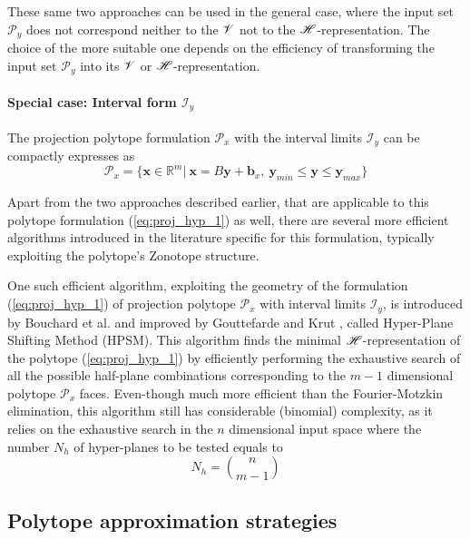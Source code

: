 These same two approaches can be used in the general case, where the input set $\mathcal{P}_y$ does not correspond neither to the $\mathscr{V}$ not to the $\mathscr{H}$-representation. The choice of the more suitable one depends on the efficiency of transforming the input set $\mathcal{P}_y$ into its $\mathscr{V}$ or $\mathscr{H}$-representation. 


\paragraph*{Special case: Interval form $\mathcal{I}_y$} 

The projection polytope formulation $\mathcal{P}_x$ with the interval limits $\mathcal{I}_y$ can be compactly expresses as
\begin{equation}
    \mathcal{P}_x=\{\bm{x}\in\mathbb{R}^m |~ \bm{x} = B\bm{y} + \bm{b}_x,~\bm{y}_{min} \leq  \bm{y} \leq \bm{y}_{max}  \}
    \label{eq:proj_hyp_1}
\end{equation}

Apart from the two approaches described earlier, that are applicable to this polytope formulation (\ref{eq:proj_hyp_1}) as well, there are several more efficient algorithms introduced in the literature specific for this formulation, typically exploiting the polytope's Zonotope structure.

One such  efficient algorithm, exploiting the geometry of the formulation (\ref{eq:proj_hyp_1}) of projection polytope $\mathcal{P}_x$ with interval limits $\mathcal{I}_y$, is introduced by Bouchard et al. \cite{Bouchard2009} and improved by Gouttefarde and Krut \cite{hyper_psm}, called Hyper-Plane Shifting Method (HPSM). This algorithm finds the minimal $\mathscr{H}$-representation of the polytope (\ref{eq:proj_hyp_1}) by efficiently performing the exhaustive search of all the possible half-plane combinations corresponding to the $m-1$ dimensional polytope $\mathcal{P}_x$ faces. Even-though much more efficient than the Fourier-Motzkin elimination, this algorithm still has considerable (binomial) complexity, as it relies on the exhaustive search in the $n$ dimensional input space where the number $N_h$ of hyper-planes to be tested equals to 
$$N_h = \binom{n}{m-1}$$

\subsection{Polytope approximation strategies}
\label{ch:approximation_algos}

